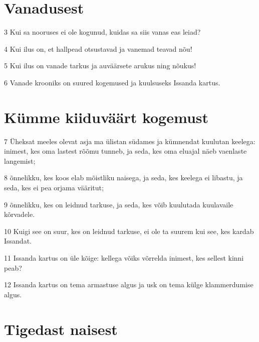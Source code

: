 \section*{Vanadusest}

\par 3 Kui sa nooruses ei ole kogunud, kuidas sa siis vanas eas leiad?
\par 4 Kui ilus on, et hallpead otsustavad ja vanemad teavad nõu!
\par 5 Kui ilus on vanade tarkus ja auväärsete arukus ning nõukus!
\par 6 Vanade krooniks on suured kogemused ja kuulsuseks Issanda kartus.

\section*{Kümme kiiduväärt kogemust}

\par 7 Üheksat meeles olevat asja ma ülistan südames ja kümnendat kuulutan keelega: inimest, kes oma lastest rõõmu tunneb, ja seda, kes oma eluajal näeb vaenlaste langemist;
\par 8 õnnelikku, kes koos elab mõistliku naisega, ja seda, kes keelega ei libastu, ja seda, kes ei pea orjama vääritut;
\par 9 õnnelikku, kes on leidnud tarkuse, ja seda, kes võib kuulutada kuulavaile kõrvadele.
\par 10 Kuigi see on suur, kes on leidnud tarkuse, ei ole ta suurem kui see, kes kardab Issandat.
\par 11 Issanda kartus on üle kõige: kellega võiks võrrelda inimest, kes sellest kinni peab?
\par 12 Issanda kartus on tema armastuse algus ja usk on tema külge klammerdumise algus.

\section*{Tigedast naisest}

